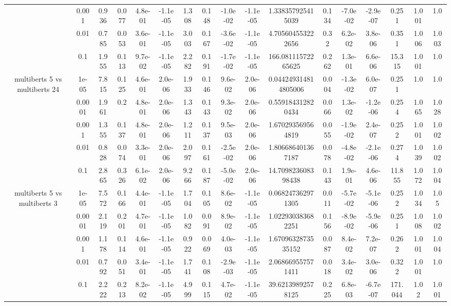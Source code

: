 \begin{tabular}{|c|c|c|c|c|c|c|c|c|c|c|c|c|c|c|c|c|}
 & 0.001 & 0.936 & 0.077 & 4.8e-01 & -1.1e-05 & 1.308 & 0.148 & -1.0e-02 & -1.1e-05 & 1.338357925415039 & 0.134 & -7.0e-02 & -2.9e-07 & 0.251 & 1.001 & 1.0 \\
 & 0.01 & 0.785 & 0.053 & 3.6e-01 & -1.1e-05 & 3.003 & 0.167 & -3.6e-02 & -1.1e-05 & 4.705604553222656 & 0.32 & 6.2e-02 & 3.8e-06 & 0.351 & 1.006 & 1.003 \\
 & 0.1 & 1.955 & 0.113 & 9.7e-02 & -1.1e-05 & 2.282 & 0.191 & -1.7e-02 & -1.1e-05 & 166.08111572265625 & 0.262 & 1.3e-01 & 6.6e-06 & 15.315 & 1.001 & 1.0 \\
\hline
\multirow{5}{*}{multiberts 5 vs multiberts 24} & 1e-05 & 7.815 & 0.125 & 4.6e-01 & 2.0e-06 & 1.933 & 0.146 & 9.6e-02 & 2.0e-06 & 0.044249314814805006 & 0.004 & -1.3e-02 & 6.0e-07 & 0.251 & 1.0 & 1.0 \\
 & 0.0001 & 1.961 & 0.2 & 4.8e-01 & 2.0e-06 & 1.343 & 0.143 & 9.3e-02 & 2.0e-06 & 0.559184312820434 & 0.066 & 1.3e-02 & -1.2e-06 & 0.254 & 1.065 & 1.028 \\
 & 0.001 & 1.355 & 0.137 & 4.8e-01 & 2.0e-06 & 1.211 & 0.137 & 9.5e-03 & 2.0e-06 & 1.670293569564819 & 0.055 & -1.9e-02 & 2.4e-07 & 0.252 & 1.001 & 1.002 \\
 & 0.01 & 0.828 & 0.074 & 3.3e-01 & 2.0e-06 & 2.097 & 0.161 & -2.5e-02 & 2.0e-06 & 1.806686401367187 & 0.078 & -4.8e-02 & -2.1e-06 & 0.274 & 1.039 & 1.002 \\
 & 0.1 & 2.865 & 0.326 & 6.1e-02 & 2.0e-06 & 9.266 & 0.187 & -5.0e-02 & 2.0e-06 & 14.709823608398438 & 0.143 & 1.9e-01 & 4.6e-06 & 11.855 & 1.072 & 1.004 \\
\hline
\multirow{5}{*}{multiberts 5 vs multiberts 3} & 1e-05 & 7.572 & 0.166 & 4.4e-01 & -1.1e-05 & 1.704 & 0.105 & 8.6e-02 & -1.1e-05 & 0.068247362971305 & 0.011 & -5.7e-02 & -5.1e-06 & 0.252 & 1.034 & 1.05 \\
 & 0.0001 & 2.119 & 0.201 & 4.7e-01 & -1.1e-05 & 1.082 & 0.091 & 8.9e-02 & -1.1e-05 & 1.022930383682251 & 0.156 & -8.9e-02 & -5.9e-06 & 0.251 & 1.008 & 1.002 \\
 & 0.001 & 1.178 & 0.114 & 4.6e-01 & -1.1e-05 & 0.922 & 0.069 & 4.0e-03 & -1.1e-05 & 1.6709632873535152 & 0.087 & 8.4e-02 & 7.2e-07 & 0.262 & 1.001 & 1.004 \\
 & 0.01 & 0.792 & 0.051 & 3.4e-01 & -1.1e-05 & 1.741 & 0.108 & -2.9e-03 & -1.1e-05 & 2.068669557571411 & 0.018 & 3.4e-02 & 3.0e-06 & 0.322 & 1.001 & 1.0 \\
 & 0.1 & 2.222 & 0.213 & 8.2e-02 & -1.1e-05 & 4.999 & 0.115 & 4.7e-02 & -1.1e-05 & 39.62139892578125 & 0.225 & 6.8e-03 & -6.7e-07 & 171.044 & 1.02 & 1.001 \\

\end{tabular}
